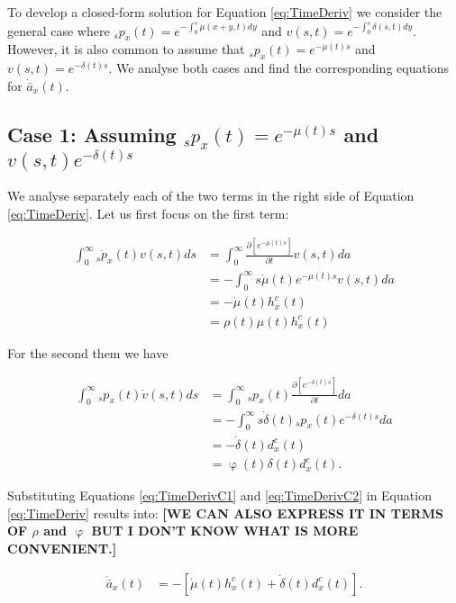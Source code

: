\documentclass[12pt]{article}
\begin{document}
To develop a closed-form solution for Equation \ref{eq:TimeDeriv} we consider the general case where $_sp_x(t)=e^{-\int_{0}^{s}\mu(x+y,t)dy}$ and ${v}(s,t)=e^{-\int_{0}^{s}\delta(s,t)dy}$. However, it is also common to assume that ${}_sp_x(t)=e^{-\mu(t)s}$ and $v(s,t)=e^{-\delta(t)s}$. We analyse both cases and find the corresponding equations for $\dot{\bar{a}} _x(t)$.




\subsection{Case 1: Assuming ${}_sp_x(t)=e^{-\mu(t)s}$ and $v(s,t)e^{-\delta(t)s}$}


We analyse separately each of the two terms in the right side of Equation \ref{eq:TimeDeriv}. Let us first focus on the first term:

\begin{equation}\label{eq:TimeDerivC1}
\begin{split}
\int_0^\infty {}_s\dot{p}_x(t) v(s,t)ds &=\int_0^\infty \frac{\partial \left[ e^{-\mu(t)s} \right]}{\partial t}v(s,t)da \\
&=-\int_0^\infty s \dot{\mu}(t) e^{-\mu(t)s} v(s,t)da \\
&=-  \dot{\mu}(t)  h^{c}_x(t) \\
&=\rho(t) \mu(t)  h^{c}_x(t) 
\end{split}
\end{equation}


For the second them we have

\begin{equation}\label{eq:TimeDerivC2}
\begin{split}
\int_0^\infty {}_s{p}_x(t) \dot{v}(s,t)ds &=\int_0^\infty {}_s{p}_x(t) \frac{\partial \left[ e^{-\delta(t)s} \right]}{\partial t}da \\
&=-\int_0^\infty s \dot{\delta}(t) {}_s{p}_x(t) e^{-\delta(t)s} da \\
&=-  \dot{\delta}(t)  d^{c}_x(t) \\
&= \upvarphi(t)\delta(t)  d^{c}_x(t).
\end{split}
\end{equation}

Substituting Equations \ref{eq:TimeDerivC1} and \ref{eq:TimeDerivC2} in Equation \ref{eq:TimeDeriv} results into: \textbf{[WE CAN ALSO EXPRESS IT IN TERMS OF $\rho$ and $\upvarphi$ BUT I DON'T KNOW WHAT IS MORE CONVENIENT.]}

\begin{equation}\label{eq:TimeDerivC}
\begin{split}
\dot{\bar{a}} _x(t)&=-[\dot{\mu}(t)  h^{c}_x(t)+\dot{\delta}(t)  d^{c}_x(t)].
\end{split}
\end{equation}
\end{document}
